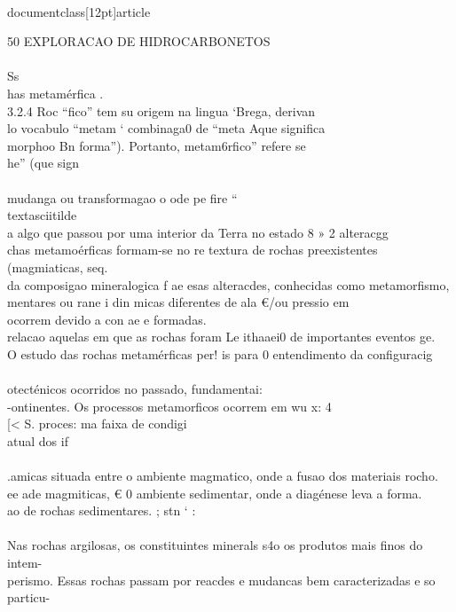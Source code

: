 \\documentclass[12pt]{article}
\begin{document}
50 EXPLORACAO DE HIDROCARBONETOS\\
\\
Ss\\
has metamérfica .\\
3.2.4 Roc “fico” tem su origem na lingua ‘Brega, derivan\\
lo vocabulo “metam ‘ combinaga0 de “meta Aque significa \\%
morphoo Bn forma”). Portanto, metam6rfico” refere se\\
he” (que sign\\
\\
mudanga ou transformagao o ode pe fire “ \\textasciitilde{}\\
a algo que passou por uma interior da Terra no estado 8 » 2 alteracgg\\
chas metamoérficas formam-se no re textura de rochas preexistentes (magmiaticas, seq.\\
da composigao mineralogica f ae esas alteracdes, conhecidas como metamorfismo,\\
mentares ou rane i din micas diferentes de ala €/ou pressio em\\
ocorrem devido a con ae e formadas.\\
relacao aquelas em que as rochas foram Le ithaaei0 de importantes eventos ge.\\
O estudo das rochas metamérficas per! is para 0 entendimento da configuracig\\
\\
otecténicos ocorridos no passado, fundamentai:\\
-ontinentes. Os processos metamorficos ocorrem em wu x: 4\\
[< S. proces: ma faixa de condigi\\
atual dos if\\
\\
.amicas situada entre o ambiente magmatico, onde a fusao dos materiais rocho.\\
ee ade magmiticas, € 0 ambiente sedimentar, onde a diagénese leva a forma.\\
ao de rochas sedimentares. ; stn ‘ :\\
\\
Nas rochas argilosas, os constituintes minerals s4o os produtos mais finos do intem-\\
perismo. Essas rochas passam por reacdes e mudancas bem caracterizadas e so particu-\\
\end{document}

